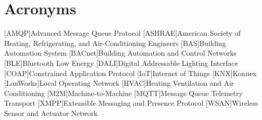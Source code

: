 \chapter{Acronyms}

\footnotesize
\SingleSpacing

\begin{multicols}{2}
\begin{acronym}[AAAAAA]

	[AMQP]{Advanced Message Queue Protocol}
	[ASHRAE]{American Society of Heating, Refrigerating, and Air-Conditioning Engineers}
	[BAS]{Building Automation System}
	[BACnet]{Building Automation and Control Networks}
	[BLE]{Bluetooth Low Energy}
	[DALI]{Digital Addressable Lighting Interface}
	[COAP]{Constrained Application Protocol}
	[IoT]{Internet of Things}
	[KNX]{Konnex}
	[LonWorks]{Local Operating Network}
	[HVAC]{Heating Ventilation and Air Conditioning}
	[M2M]{Machine-to-Machine}
	[MQTT]{Message Queue Telemetry Transport}
	[XMPP]{Extensible Messaging and Presence Protocol}
	[WSAN]{Wireless Sensor and Actuator Network}
	


\end{acronym}
\end{multicols}

